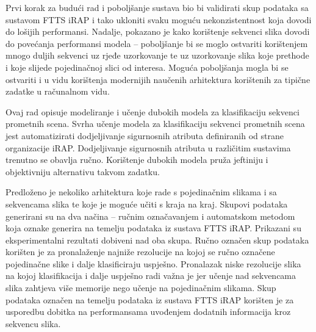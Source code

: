 \documentclass[times, utf8, diplomski, numeric]{fer}
\begin{document}
Prvi korak za budući rad i poboljšanje sustava bio bi validirati skup podataka sa sustavom FTTS iRAP i tako ukloniti svaku moguću nekonzistentnost koja dovodi do lošijih performansi. 
Nadalje, pokazano je kako korištenje sekvenci slika dovodi do povećanja performansi modela -- poboljšanje bi se moglo ostvariti korištenjem mnogo duljih sekvenci uz rjeđe uzorkovanje te uz uzorkovanje slika koje prethode i koje slijede pojedinačnoj slici od interesa. 
Moguća poboljšanja mogla bi se ostvariti i u vidu korištenja modernijih naučenih arhitektura korištenih za tipične zadatke u računalnom vidu.




\begin{sazetak}
Ovaj rad opisuje modeliranje i učenje dubokih modela za klasifikaciju sekvenci prometnih scena.
Svrha učenje modela za klasifikaciju sekvenci prometnih scena jest automatizirati dodjeljivanje sigurnosnih atributa definiranih od strane organizacije iRAP.
Dodjeljivanje sigurnosnih atributa u različitim sustavima trenutno se obavlja ručno.
Korištenje dubokih modela pruža jeftiniju i objektivniju alternativu takvom zadatku.

Predloženo je nekoliko arhitektura koje rade s pojedinačnim slikama i sa sekvencama slika te koje je moguće učiti s kraja na kraj.
Skupovi podataka generirani su na dva načina -- ručnim označavanjem i automatskom metodom koja oznake generira na temelju podataka iz sustava FTTS iRAP.
Prikazani su eksperimentalni rezultati dobiveni nad oba skupa.
Ručno označen skup podataka korišten je za pronalaženje najniže rezolucije na kojoj se ručno označene pojedinačne slike i dalje klasificiraju uspješno. 
Pronalazak niske rezolucije slika na kojoj klasifikacija i dalje uspješno radi važna je jer učenje nad sekvencama slika zahtjeva više memorije nego učenje na pojedinačnim slikama.
Skup podataka označen na temelju podataka iz sustava FTTS iRAP korišten je za usporedbu dobitka na performansama uvođenjem dodatnih informacija kroz sekvencu slika.


 \\
\end{sazetak}
\end{document}
